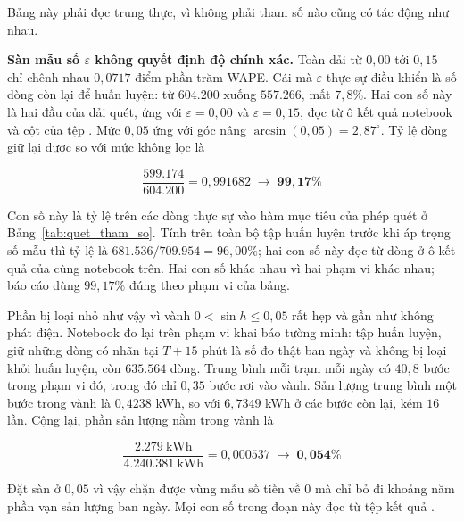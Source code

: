 Bảng này phải đọc trung thực, vì không phải tham số nào cũng có tác động như nhau.

\textbf{Sàn mẫu số $\varepsilon$ không quyết định độ chính xác.} Toàn dải từ $0{,}00$ tới
$0{,}15$ chỉ chênh nhau $0{,}0717$ điểm phần trăm WAPE. Cái mà $\varepsilon$ thực sự điều
khiển là số dòng còn lại để huấn luyện: từ $604.200$ xuống $557.266$, mất $7{,}8\%$. Hai
con số này là hai đầu của dải quét, ứng với $\varepsilon = 0{,}00$ và $\varepsilon = 0{,}15$,
đọc từ ô kết quả notebook  và cột
 của tệp .
Mức $0{,}05$ ứng với góc nâng $\arcsin(0{,}05) = 2{,}87^\circ$. Tỷ lệ dòng giữ lại được so với mức
không lọc là

\begin{equation}
\frac{599.174}{604.200} = 0{,}991682 \;\longrightarrow\; \mathbf{99{,}17\%}
\end{equation}

Con số này là tỷ lệ trên các dòng thực sự vào hàm mục tiêu của phép quét ở
Bảng~\ref{tab:quet_tham_so}. Tính trên toàn bộ tập huấn luyện trước khi áp trọng số mẫu thì
tỷ lệ là $681.536 / 709.954 = 96{,}00\%$; hai con số này đọc từ dòng
 ở ô kết quả của cùng notebook trên. Hai con số khác nhau vì hai phạm vi khác nhau; báo
cáo dùng $99{,}17\%$ đúng theo phạm vi của bảng.

Phần bị loại nhỏ như vậy vì vành $0 < \sin h \le 0{,}05$ rất hẹp và gần như không phát điện.
Notebook  đo lại trên phạm vi khai báo tường minh:
tập huấn luyện, giữ những dòng có nhãn tại $T{+}15$ phút là số đo thật ban ngày và không bị
loại khỏi huấn luyện, còn $635.564$ dòng. Trung bình mỗi trạm mỗi ngày có $40{,}8$ bước trong
phạm vi đó, trong đó chỉ $0{,}35$ bước rơi vào vành. Sản lượng trung bình một bước trong vành
là $0{,}4238$ kWh, so với $6{,}7349$ kWh ở các bước còn lại, kém $16$ lần. Cộng lại, phần sản
lượng nằm trong vành là

\begin{equation}
\frac{2.279\ \text{kWh}}{4.240.381\ \text{kWh}} = 0{,}000537 \;\longrightarrow\;
\mathbf{0{,}054\%}
\end{equation}

Đặt sàn ở $0{,}05$ vì vậy chặn được vùng mẫu số tiến về $0$ mà chỉ bỏ đi khoảng năm phần vạn
sản lượng ban ngày. Mọi con số trong đoạn này đọc từ tệp kết quả
.

